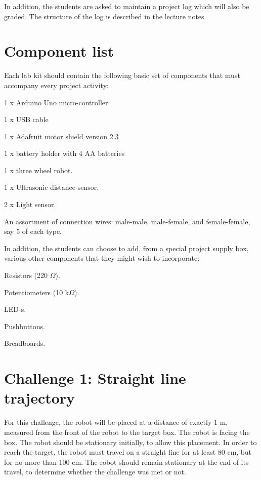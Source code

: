 \documentclass[12pt]{book}
\begin{document}
In addition, the students are asked to maintain a project log which
will also be graded. The structure of the log is described in the
lecture notes. 


\section{Component list}

Each lab kit should contain the following basic set of components
that must accompany every project activity:

\begin{compactitem}[--]
  \item 1 x Arduino Uno micro-controller
  \item 1 x USB cable
  \item 1 x Adafruit motor shield version 2.3
  \item 1 x battery holder with 4 AA batteries
  \item 1 x three wheel robot.
  \item 1 x Ultrasonic distance sensor.
  \item 2 x Light sensor.
  \item An assortment of connection wires: male-male, male-female, and
    female-female, say 5 of each type.
\end{compactitem}

In addition, the students can choose to add, from a special project supply
box, various other components that they might wish to incorporate:
\begin{compactitem}[--]
\item Resistors (220 $\Omega$).
\item Potentiometers (10 k$\Omega$).
\item LED-s.
\item Pushbuttons.
\item Breadboards.
\end{compactitem}



\section{Challenge 1: Straight line trajectory}\label{proj1:chap}

For this challenge, the robot will be placed at a distance of exactly
1 m, measured from the front of the robot to the target box. The robot
is facing the box. The robot should be stationary initially, to allow
this placement. In order to reach the target, the robot must travel on
a straight line for at least 80 cm, but for no more than 100 cm. The
robot should remain stationary at the end of its travel, to determine
whether the challenge was met or not.
\end{document}
